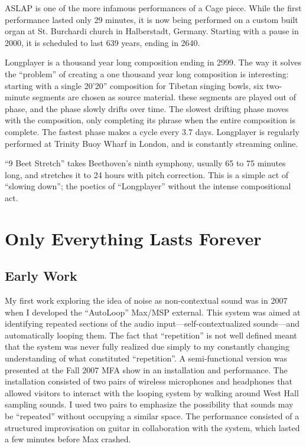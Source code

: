 \documentclass{thesis}
\begin{document}
ASLAP is one of the more infamous performances of a Cage piece. While the first performance lasted only 29 minutes, it is now being performed on a custom built organ at St. Burchardi church in Halberstadt, Germany. Starting with a pause in 2000, it is scheduled to last 639 years, ending in 2640.
	
Longplayer is a thousand year long composition ending in 2999. The way it solves the ``problem'' of creating a one thousand year long composition is interesting: starting with a single 20'20'' composition for Tibetan singing bowls, six two-minute segments are chosen as source material. these segments are played out of phase, and the phase slowly drifts over time. The slowest drifting phase moves with the composition, only completing its phrase when the entire composition is complete. The fastest phase makes a cycle every 3.7 days. Longplayer is regularly performed at Trinity Buoy Wharf in London, and is constantly streaming online.

``9 Beet Stretch'' takes Beethoven's ninth symphony, usually 65 to 75 minutes long, and stretches it to 24 hours with pitch correction. This is a simple act of ``slowing down''; the poetics of ``Longplayer'' without the intense compositional act.
				
\chapter{Only Everything Lasts Forever}

\section{Early Work}

My first work exploring the idea of noise as non-contextual sound was in 2007 when I developed the ``AutoLoop'' Max/MSP external. This system was aimed at identifying repeated sections of the audio input---self-contextualized sounds---and automatically looping them. The fact that ``repetition'' is not well defined meant that the system was never fully realized due simply to my constantly changing understanding of what constituted ``repetition''. A semi-functional version was presented at the Fall 2007 MFA show in an installation and performance. The installation consisted of two pairs of wireless microphones and headphones that allowed visitors to interact with the looping system by walking around West Hall sampling sounds. I used two pairs to emphasize the possibility that sounds may be ``repeated'' without occupying a similar space. The performance consisted of a structured improvisation on guitar in collaboration with the system, which lasted a few minutes before Max crashed.
\end{document}
